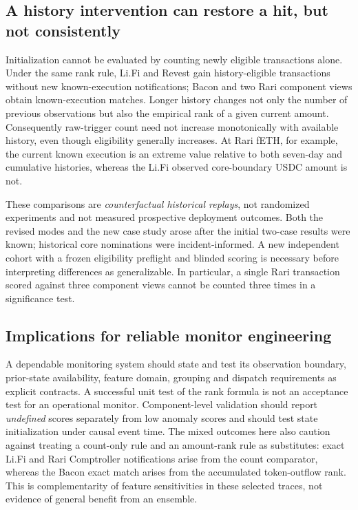 \documentclass[preprint,12pt,authoryear]{elsarticle}
\begin{document}
\subsection{A history intervention can restore a hit, but not consistently}
Initialization cannot be evaluated by counting newly eligible transactions alone. Under the same rank rule, Li.Fi and Revest gain history-eligible transactions without new known-execution notifications; Bacon and two Rari component views obtain known-execution matches. Longer history changes not only the number of previous observations but also the empirical rank of a given current amount. Consequently raw-trigger count need not increase monotonically with available history, even though eligibility generally increases. At Rari fETH, for example, the current known execution is an extreme value relative to both seven-day and cumulative histories, whereas the Li.Fi observed core-boundary USDC amount is not.

These comparisons are \emph{counterfactual historical replays}, not randomized experiments and not measured prospective deployment outcomes. Both the revised modes and the new case study arose after the initial two-case results were known; historical core nominations were incident-informed. A new independent cohort with a frozen eligibility preflight and blinded scoring is necessary before interpreting differences as generalizable. In particular, a single Rari transaction scored against three component views cannot be counted three times in a significance test.

\subsection{Implications for reliable monitor engineering}
A dependable monitoring system should state and test its observation boundary, prior-state availability, feature domain, grouping and dispatch requirements as explicit contracts. A successful unit test of the rank formula is not an acceptance test for an operational monitor. Component-level validation should report \emph{undefined} scores separately from low anomaly scores and should test state initialization under causal event time. The mixed outcomes here also caution against treating a count-only rule and an amount-rank rule as substitutes: exact Li.Fi and Rari Comptroller notifications arise from the count comparator, whereas the Bacon exact match arises from the accumulated token-outflow rank. This is complementarity of feature sensitivities in these selected traces, not evidence of general benefit from an ensemble.
\end{document}

